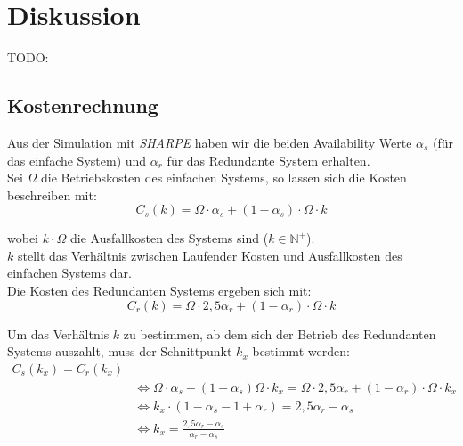 \documentclass[
            a4paper
            ]{scrartcl}%
\begin{document}
\section{Diskussion}
TODO:
\subsection{Kostenrechnung}
Aus der Simulation mit \emph{SHARPE} haben wir die beiden Availability Werte $\alpha_s$ (für das einfache System) und $\alpha_r$ für das Redundante System erhalten.\\
Sei $\Omega$ die Betriebskosten des einfachen Systems, so lassen sich die Kosten beschreiben mit:
\begin{equation}
C_s(k) = \Omega \cdot \alpha_s + (1-\alpha_s)\cdot \Omega \cdot k
\end{equation}

wobei $k \cdot \Omega$ die Ausfallkosten des Systems sind ($k \in
\mathbb{N}^+$).\\$k$ stellt das Verhältnis zwischen Laufender Kosten und Ausfallkosten des einfachen Systems dar.\\
Die Kosten des Redundanten Systems ergeben sich mit: 
\begin{equation}
C_r(k) = \Omega \cdot 2,5 \alpha_r + (1- \alpha_r) \cdot \Omega \cdot k
\end{equation}

Um das Verhältnis $k$ zu bestimmen, ab dem sich der Betrieb des Redundanten Systems auszahlt, muss der Schnittpunkt $k_x$ bestimmt werden:
\begin{equation}
\begin{split}
C_s(k_x) = C_r(k_x) \\ &
 \Leftrightarrow
\Omega \cdot \alpha_s + (1-\alpha_s)\Omega \cdot k_x = \Omega \cdot 2,5 \alpha_r + (1- \alpha_r) \cdot \Omega \cdot k_x \\ & \Leftrightarrow
k_x \cdot (1 - \alpha_s - 1 + \alpha_r) = 2,5 \alpha_r - \alpha_s \\ & \Leftrightarrow
k_x = \frac{2,5 \alpha_r - \alpha_s}{\alpha_r - \alpha_s}
\end{split}
\end{equation}
\end{document}
